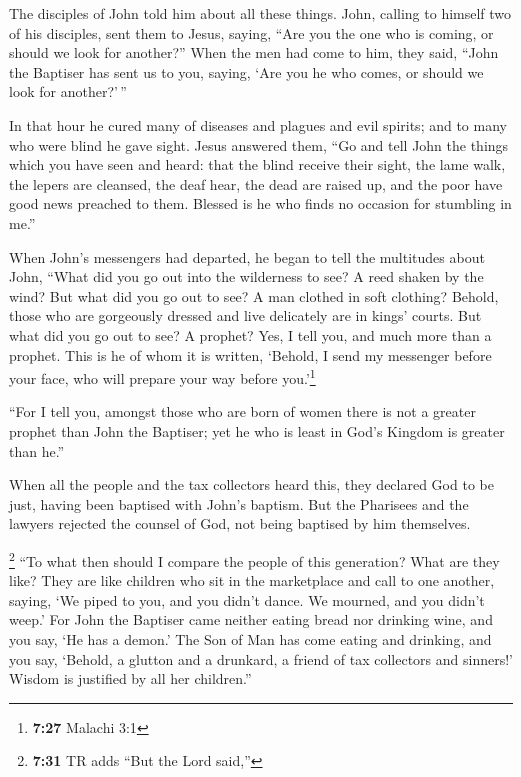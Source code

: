  The disciples of John told him about all these things.
 John, calling to himself two of his disciples, sent them
to Jesus, saying, ``Are you the one who is coming, or should we look for
another?''  When the men had come to him, they said,
``John the Baptiser has sent us to you, saying, `Are you he who comes,
or should we look for another?'\,''

 In that hour he cured many of diseases and plagues and
evil spirits; and to many who were blind he gave sight. 
Jesus answered them, ``Go and tell John the things which you have seen
and heard: that the blind receive their sight, the lame walk, the lepers
are cleansed, the deaf hear, the dead are raised up, and the poor have
good news preached to them.  Blessed is he who finds no
occasion for stumbling in me.''

 When John's messengers had departed, he began to tell
the multitudes about John, ``What did you go out into the wilderness to
see? A reed shaken by the wind?  But what did you go out
to see? A man clothed in soft clothing? Behold, those who are gorgeously
dressed and live delicately are in kings' courts.  But
what did you go out to see? A prophet? Yes, I tell you, and much more
than a prophet.  This is he of whom it is written,
`Behold, I send my messenger before your face, who will prepare your way
before you.'\footnote{\textbf{7:27} Malachi 3:1}

 ``For I tell you, amongst those who are born of women
there is not a greater prophet than John the Baptiser; yet he who is
least in God's Kingdom is greater than he.''

 When all the people and the tax collectors heard this,
they declared God to be just, having been baptised with John's baptism.
 But the Pharisees and the lawyers rejected the counsel
of God, not being baptised by him themselves.

 \footnote{\textbf{7:31} TR adds ``But the Lord said,''}
``To what then should I compare the people of this generation? What are
they like?  They are like children who sit in the
marketplace and call to one another, saying, `We piped to you, and you
didn't dance. We mourned, and you didn't weep.'  For John
the Baptiser came neither eating bread nor drinking wine, and you say,
`He has a demon.'  The Son of Man has come eating and
drinking, and you say, `Behold, a glutton and a drunkard, a friend of
tax collectors and sinners!'  Wisdom is justified by all
her children.''

